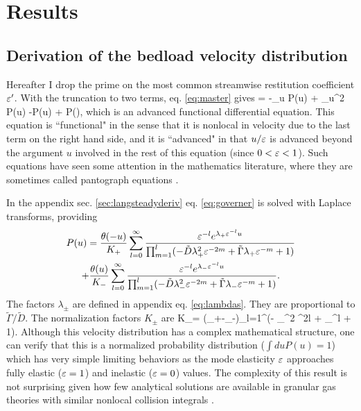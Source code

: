 \section{Results}
\label{sec:langresults}

\subsection{Derivation of the bedload velocity distribution}
\label{sec:langsolution}
Hereafter I drop the prime on the most common streamwise restitution coefficient $\varepsilon'$.
With the truncation to two terms, eq. \ref{eq:master} gives 
 = -\tilde{\Gamma}\partial_u P(u) + \partial_u^2 P(u) -P(u) +  P\big(\big),\label{eq:governer} \ee
which is an advanced functional differential equation. This equation is ``functional" in the sense that it is nonlocal in velocity due to the last term on the right hand side, and it is ``advanced" in that $u/\varepsilon$ is advanced beyond the argument $u$ involved in the rest of this equation (since $0<\varepsilon<1$).
Such equations have seen some attention in the mathematics literature, where they are sometimes called pantograph equations \citep{Hall1989, Kim1998,Zaidi2015}.

In the appendix sec. \ref{sec:langsteadyderiv} eq. \ref{eq:governer} is solved with Laplace transforms, providing
\begin{multline} P(u) = \frac{\theta(-u)}{K_+}\sum_{l=0}^\infty \frac{\varepsilon^{-l}e^{\lambda_+\varepsilon^{-l}u}}{\prod_{m=1}^l(-\tilde{D} \lambda_+^2 \varepsilon^{-2m} + \tilde{\Gamma} \lambda_+ \varepsilon^{-m} + 1) } 
	\\+ \frac{\theta(u)}{K_-}\sum_{l=0}^\infty \frac{\varepsilon^{-l}e^{\lambda_-\varepsilon^{-l}u}}{\prod_{m=1}^l(- \tilde{D} \lambda_-^2 \varepsilon^{-2m} + \tilde{\Gamma} \lambda_- \varepsilon^{-m} + 1) } \label{eq:steadystate}. \end{multline}
The factors $\lambda_\pm$ are defined in appendix eq. \ref{eq:lambdas}. They are proportional to $\tilde{\Gamma}/\tilde{D}$. 
The normalization factors $K_\pm$ are 
\be K_\pm = (\lambda_+-\lambda_-)\prod_{l=1}^\infty (- \lambda_\pm^2 \ve^{2l} +\tilde{\Gamma} \lambda_\pm \ve^{l} + 1). \ee
Although this velocity distribution has a complex mathematical structure, one can verify that this is a normalized probability distribution ($\int du P(u) = 1$) which has very simple limiting behaviors as the mode elasticity $\varepsilon$ approaches fully elastic ($\varepsilon=1$) and inelastic ($\varepsilon = 0$) values. The complexity of this result is not surprising given how few analytical solutions are available in granular gas theories with similar nonlocal collision integrals \citep[e.g.][]{Brilliantov2004}.

